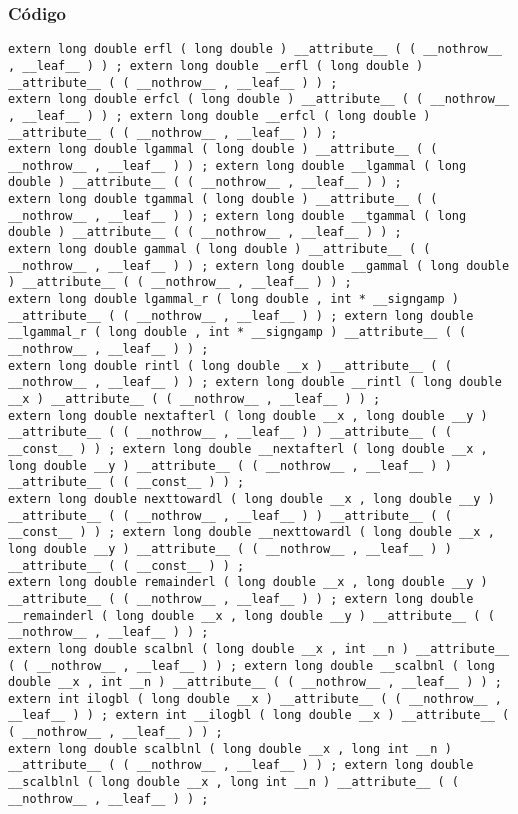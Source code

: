 \documentclass{beamer}
\begin{document}
\begin{frame}[fragile]
\frametitle{C\'odigo}
\begin{verbatim}
extern long double erfl ( long double ) __attribute__ ( ( __nothrow__ , __leaf__ ) ) ; extern long double __erfl ( long double ) __attribute__ ( ( __nothrow__ , __leaf__ ) ) ; 
extern long double erfcl ( long double ) __attribute__ ( ( __nothrow__ , __leaf__ ) ) ; extern long double __erfcl ( long double ) __attribute__ ( ( __nothrow__ , __leaf__ ) ) ; 
extern long double lgammal ( long double ) __attribute__ ( ( __nothrow__ , __leaf__ ) ) ; extern long double __lgammal ( long double ) __attribute__ ( ( __nothrow__ , __leaf__ ) ) ; 
extern long double tgammal ( long double ) __attribute__ ( ( __nothrow__ , __leaf__ ) ) ; extern long double __tgammal ( long double ) __attribute__ ( ( __nothrow__ , __leaf__ ) ) ; 
extern long double gammal ( long double ) __attribute__ ( ( __nothrow__ , __leaf__ ) ) ; extern long double __gammal ( long double ) __attribute__ ( ( __nothrow__ , __leaf__ ) ) ; 
extern long double lgammal_r ( long double , int * __signgamp ) __attribute__ ( ( __nothrow__ , __leaf__ ) ) ; extern long double __lgammal_r ( long double , int * __signgamp ) __attribute__ ( ( __nothrow__ , __leaf__ ) ) ; 
extern long double rintl ( long double __x ) __attribute__ ( ( __nothrow__ , __leaf__ ) ) ; extern long double __rintl ( long double __x ) __attribute__ ( ( __nothrow__ , __leaf__ ) ) ; 
extern long double nextafterl ( long double __x , long double __y ) __attribute__ ( ( __nothrow__ , __leaf__ ) ) __attribute__ ( ( __const__ ) ) ; extern long double __nextafterl ( long double __x , long double __y ) __attribute__ ( ( __nothrow__ , __leaf__ ) ) __attribute__ ( ( __const__ ) ) ; 
extern long double nexttowardl ( long double __x , long double __y ) __attribute__ ( ( __nothrow__ , __leaf__ ) ) __attribute__ ( ( __const__ ) ) ; extern long double __nexttowardl ( long double __x , long double __y ) __attribute__ ( ( __nothrow__ , __leaf__ ) ) __attribute__ ( ( __const__ ) ) ; 
extern long double remainderl ( long double __x , long double __y ) __attribute__ ( ( __nothrow__ , __leaf__ ) ) ; extern long double __remainderl ( long double __x , long double __y ) __attribute__ ( ( __nothrow__ , __leaf__ ) ) ; 
extern long double scalbnl ( long double __x , int __n ) __attribute__ ( ( __nothrow__ , __leaf__ ) ) ; extern long double __scalbnl ( long double __x , int __n ) __attribute__ ( ( __nothrow__ , __leaf__ ) ) ; 
extern int ilogbl ( long double __x ) __attribute__ ( ( __nothrow__ , __leaf__ ) ) ; extern int __ilogbl ( long double __x ) __attribute__ ( ( __nothrow__ , __leaf__ ) ) ; 
extern long double scalblnl ( long double __x , long int __n ) __attribute__ ( ( __nothrow__ , __leaf__ ) ) ; extern long double __scalblnl ( long double __x , long int __n ) __attribute__ ( ( __nothrow__ , __leaf__ ) ) ; 
\end{verbatim}
\end{frame}
\end{document}
